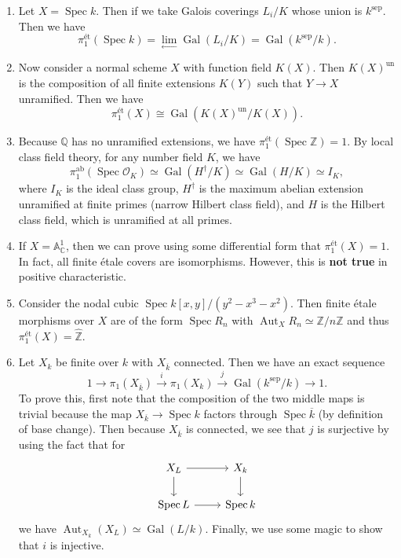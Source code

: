 \documentclass[leqno, openany]{memoir}
\theoremstyle{definition}
\theoremstyle{remark}
\theoremstyle{plain}
\theoremstyle{definition}
\theoremstyle{remark}
\newcommand{\A}{\mathbb{A}}
\newcommand{\C}{\mathbb{C}}
\newcommand{\Z}{\mathbb{Z}}
\newcommand{\Q}{\mathbb{Q}}
\newcommand{\mc}[1]{\mathcal{#1}}
\newcommand{\mr}[1]{\mathrm{#1}}
\newcommand{\ol}[1]{\overline{#1}}
\newcommand{\wh}[1]{\widehat{#1}}
\DeclareMathOperator{\Aut}{Aut}
\DeclareMathOperator{\Gal}{Gal}
\DeclareMathOperator{\Spec}{Spec}
\begin{document}
\begin{enumerate} \item Let $X = \Spec k$. Then if we take Galois coverings
    $L_i / K$ whose union is $k^{\mr{sep}}$. Then we have \[
    \pi_1^{\text{\'et}}(\Spec k) = \lim_{\longleftarrow} \Gal(L_i/K) =
\Gal(k^{\mr{sep}} / k). \] \item Now consider a normal scheme $X$ with function
field $K(X)$. Then $K(X)^{\mr{un}}$ is the composition of all finite extensions
$K(Y)$ such that $Y \to X$ unramified. Then we have \[ \pi_1^{\text{\'et}}(X)
\cong \Gal(K(X)^{\mr{un}} / K(X)). \] \item Because $\Q$ has no unramified
extensions, we have $\pi_1^{\text{\'et}}(\Spec \Z) = 1$. By local class field
theory, for any number field $K$, we have \[ \pi_1^{\mr{ab}}(\Spec \mc{O}_K)
\simeq \Gal(H^{\dag}/K) \simeq \Gal(H/K) \simeq I_K, \] where $I_K$ is the
ideal class group, $H^{\dag}$ is the maximum abelian extension unramified at
finite primes (narrow Hilbert class field), and $H$ is the Hilbert class field,
which is unramified at all primes.  \item If $X = \A^1_{\C}$, then we can prove
using some differential form that $\pi_1^{\text{\'et}}(X) = 1$. In fact, all
finite \'etale covers are isomorphisms. However, this is \textbf{not true} in
positive characteristic.  \item Consider the nodal cubic $\Spec
k[x,y]/(y^2-x^3-x^2)$. Then finite \'etale morphisms over $X$ are of the form
$\Spec R_n$ with $\Aut_X R_n \simeq \Z/n\Z$ and thus $\pi_1^{\text{\'et}}(X) =
\wh{\Z}$.  \item Let $X_k$ be finite over $k$ with $X_{\ol{k}}$ connected. Then
we have an exact sequence \[ 1 \to \pi_1(X_{\ol{k}}) \xrightarrow{i} \pi_1(X_k)
\xrightarrow{j} \Gal(k^{\mr{sep}}/k) \to 1. \] To prove this, first note that
the composition of the two middle maps is trivial because the map $X_{\ol{k}}
\to \Spec k$ factors through $\Spec \ol{k}$ (by definition of base change).
Then because $X_{\ol{k}}$ is connected, we see that $j$ is surjective by using
the fact that for \begin{equation*} \begin{tikzcd} X_L \arrow{r} \arrow{d} &
X_k \arrow{d} \\ \Spec L \arrow{r} & \Spec k \end{tikzcd} \end{equation*} we
have $\Aut_{X_k}(X_L) \simeq \Gal(L/k)$. Finally, we use some magic to show
that $i$ is injective.  \end{enumerate}
\end{document}
